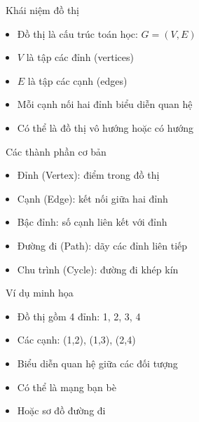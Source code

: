\documentclass{beamer}
\begin{document}
\begin{frame}{\faProjectDiagram\ Khái niệm đồ thị}
\begin{tcolorbox}
\begin{itemize}
\item Đồ thị là cấu trúc toán học: $G = (V, E)$
\item $V$ là tập các đỉnh (vertices)
\item $E$ là tập các cạnh (edges)
\item Mỗi cạnh nối hai đỉnh biểu diễn quan hệ
\item Có thể là đồ thị vô hướng hoặc có hướng
\end{itemize}
\end{tcolorbox}
\end{frame}

\begin{frame}{\faCubes\ Các thành phần cơ bản}
\begin{tcolorbox}
\begin{itemize}
\item Đỉnh (Vertex): điểm trong đồ thị
\item Cạnh (Edge): kết nối giữa hai đỉnh
\item Bậc đỉnh: số cạnh liên kết với đỉnh
\item Đường đi (Path): dãy các đỉnh liên tiếp
\item Chu trình (Cycle): đường đi khép kín
\end{itemize}
\end{tcolorbox}
\end{frame}

\begin{frame}{\faLightbulb\ Ví dụ minh họa}
\begin{tcolorbox}
\begin{itemize}
\item Đồ thị gồm 4 đỉnh: 1, 2, 3, 4
\item Các cạnh: (1,2), (1,3), (2,4)
\item Biểu diễn quan hệ giữa các đối tượng
\item Có thể là mạng bạn bè
\item Hoặc sơ đồ đường đi
\end{itemize}
\end{tcolorbox}

\vspace{0.3cm}

\begin{center}
\end{center}
\end{frame}
\end{document}

